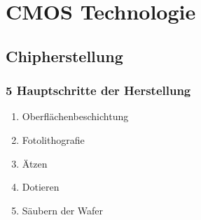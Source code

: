 \section{CMOS Technologie}
\subsection{Chipherstellung}
\subsubsection{5 Hauptschritte der Herstellung}
\begin{enumerate}
  \item Oberflächenbeschichtung
  \item Fotolithografie
  \item Ätzen
  \item Dotieren
  \item Säubern der Wafer
\end{enumerate}
